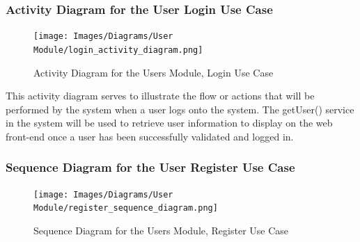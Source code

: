 \documentclass[runningheads,a4paper]{article}
\begin{document}
\subsubsection {Activity Diagram for the User Login Use Case}
 	\begin{figure}[H]
   	\centering
   	\texttt{[image: Images/Diagrams/User Module/login\_activity\_diagram.png]}
   	\caption{Activity Diagram for the Users Module, Login Use Case}
	\end{figure}
	
	This activity diagram serves to illustrate the flow or actions that will be performed by the system when a user logs onto the system. The getUser() service in the system will be used to retrieve user information to display on the web front-end once a user has been successfully validated and logged in. 
\subsubsection {Sequence Diagram for the User Register Use Case}
 	\begin{figure}[H]
   	\centering
   	\texttt{[image: Images/Diagrams/User Module/register\_sequence\_diagram.png]}
   	\caption{Sequence Diagram for the Users Module, Register Use Case}
	\end{figure}
	
\end{document}
